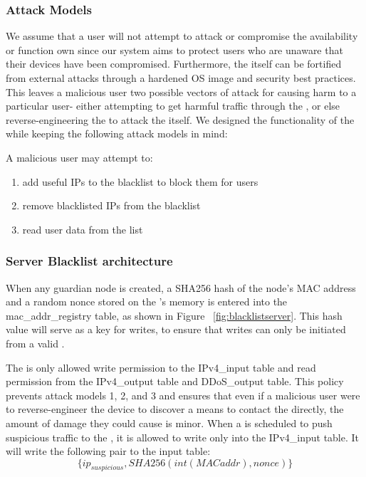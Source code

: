 \subsubsection{Attack Models}
\label{sec:design:attacks}
We assume that a user will not attempt to attack or compromise the availability or function own \nodename since our system aims to protect users who are unaware that their devices have been compromised. Furthermore, the \nodename itself can be fortified from external attacks through a hardened OS image and security best practices. This leaves a malicious user two possible vectors of attack for causing harm to a particular user- either attempting to get harmful traffic through the \nodename, or else reverse-engineering the \nodename to attack the \servname itself. 
We designed the functionality of the \servname while keeping the following attack models in mind:

A malicious user may attempt to:
\begin{enumerate}
\item add useful IPs to the blacklist to block them for users
\item remove blacklisted IPs from the blacklist
\item read user data from the list
\end{enumerate}

\subsubsection{Server Blacklist architecture}
\label{sec:design:blacklist}
When any guardian node is created, a SHA256 hash of the node's MAC address and a random nonce stored on the \nodename's memory is entered into the mac_addr_registry table, as shown in Figure ~\ref{fig:blacklistserver}. This hash value will serve as a key for writes, to ensure that writes can only be initiated from a valid \nodename.

The \nodename is only allowed write permission to the IPv4_input table and read permission from the IPv4_output table and DDoS_output table. This policy prevents attack models 1, 2, and 3 and ensures that even if a malicious user were to reverse-engineer the device to discover a means to contact the \servname directly, the amount of damage they could cause is minor. When a \nodename is scheduled to push suspicious traffic to the \servname, it is allowed to write only into the IPv4_input table. It will write the following pair to the input table: \[\{ip_{suspicious}, SHA256(int(MAC addr), nonce)\}\] 

